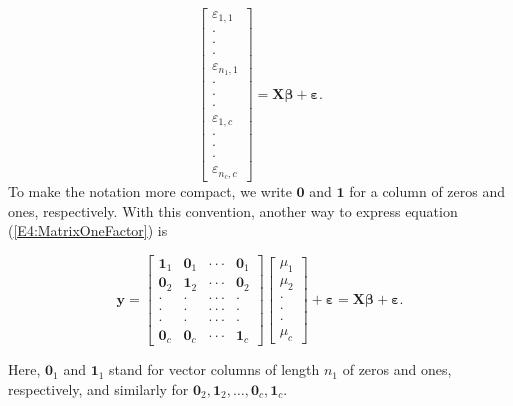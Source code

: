 \begin{equation}
\begin{bmatrix}
\varepsilon_{1,1} \\
\cdot  \\
\cdot  \\
\cdot  \\
\varepsilon_{n_1,1} \\
\cdot  \\
\cdot  \\
\cdot  \\
\varepsilon_{1,c} \\
\cdot  \\
\cdot  \\
\cdot  \\
\varepsilon_{n_{c},c}
\end{bmatrix}
=\mathbf{X} \boldsymbol \beta + \boldsymbol \varepsilon .
\end{equation}
To make the notation more compact, we write $\mathbf{0}$ and
$\mathbf{1}$ for a column of zeros and ones, respectively. With this
convention, another way to express equation
(\ref{E4:MatrixOneFactor}) is

\begin{center}
\begin{equation}\label{E4:Matrix2OneFactor}
\mathbf{y}=%
\begin{bmatrix}
\mathbf{1}_1 & \mathbf{0}_1 & \cdot \cdot \cdot  & \mathbf{0}%
_1 \\
\mathbf{0}_2 & \mathbf{1}_2 & \cdot \cdot \cdot  & \mathbf{0}%
_2 \\
\cdot  & \cdot  & \cdot \cdot \cdot  & \cdot  \\
\cdot  & \cdot  & \cdot \cdot \cdot  & \cdot  \\
\cdot  & \cdot  & \cdot \cdot \cdot  & \cdot  \\
\mathbf{0}_c & \mathbf{0}_c & \cdot \cdot \cdot  & \mathbf{1}_c
\end{bmatrix}
\begin{bmatrix}
\mu_1 \\
\mu_2 \\
\cdot  \\
\cdot  \\
\cdot  \\
\mu_c%
\end{bmatrix}
+\boldsymbol \varepsilon = \mathbf{X} \boldsymbol \beta +
\boldsymbol \varepsilon .
\end{equation}
\end{center}

\noindent Here, $\mathbf{0}_1$ and $\mathbf{1}_1$ stand for vector
columns of length $n_1$ of zeros and ones, respectively, and
similarly for $\mathbf{0}_2, \mathbf{1}_2, \ldots, \mathbf{0}_c,
\mathbf{1}_c$.

